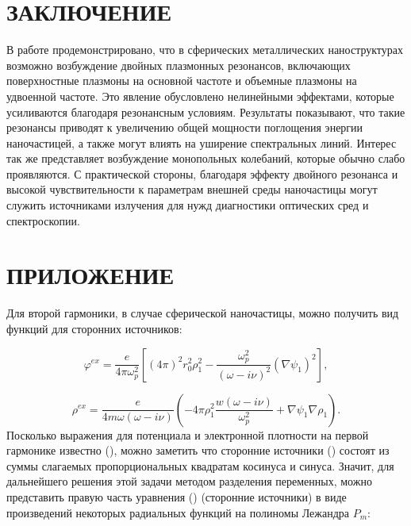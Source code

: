 \documentclass[12pt, a4paper]{article}
\def \w {\omega}
\def \ph {\varphi}
\begin{document}
\section{ЗАКЛЮЧЕНИЕ}

В работе продемонстрировано, что в сферических металлических наноструктурах возможно возбуждение двойных плазмонных резонансов, включающих поверхностные плазмоны на основной частоте и объемные плазмоны на удвоенной частоте. Это явление обусловлено нелинейными эффектами, которые усиливаются благодаря резонансным условиям. Результаты показывают, что такие резонансы приводят к увеличению общей мощности поглощения энергии наночастицей, а также могут влиять на уширение спектральных линий. Интерес так же представляет возбуждение монопольных колебаний, которые обычно слабо проявляются. С практической стороны, благодаря эффекту двойного резонанса и высокой чувствительности к параметрам внешней среды наночастицы могут служить источниками излучения для нужд диагностики оптических сред и спектроскопии.

\section{ПРИЛОЖЕНИЕ}
Для второй гармоники, в случае сферической наночастицы, можно получить вид функций для сторонних источников:

\begin{equation} 	
 \ph^{ex} = \frac{e}{4 \pi \w_p^2}[(4\pi)^2r_0^2\rho_1^2 - \frac{\w_p^2}{(\w - i \nu)^2}(\nabla \psi_1)^2], 
\end{equation}

\begin{equation} 	
\rho^{ex} = \frac{e}{4 m \w(\w - i \nu)}(-4 \pi \rho_1^2 \frac{w(\w - i \nu)}{\w_p^2} + \nabla \psi_1\nabla \rho_1).
\end{equation}
Посколько выражения для потенциала и электронной плотности на первой гармонике известно (), можно заметить что сторонние источники () состоят из суммы слагаемых пропорциональных квадратам косинуса и синуса. Значит, для дальнейшего решения этой задачи методом разделения переменных, можно представить правую часть уравнения () (сторонние источники) в виде произведений некоторых радиальных функций на
полиномы Лежандра $P_m$:
\end{document}
